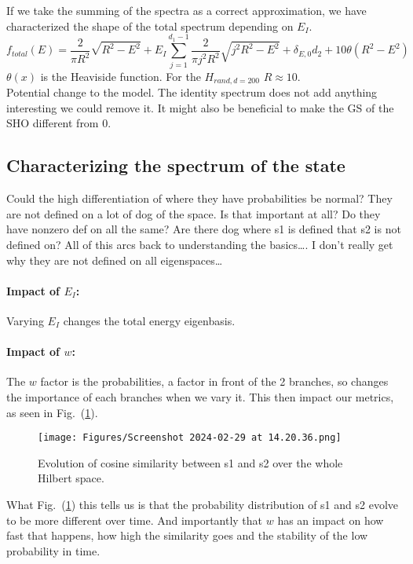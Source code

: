 \documentclass{article}
\begin{document}
If we take the summing of the spectra as a correct approximation, we have characterized the shape of the total spectrum depending on $E_I$. 
\begin{equation}
    f_{total}(E) = \frac{2}{\pi R^2}\sqrt{R^2-E^2} + E_I\sum_{j=1}^{d_1-1}\frac{2}{\pi j^2R^2}\sqrt{j^2R^2-E^2} + \delta_{E,0}d_2 + 10\theta(R^2-E^2)
\end{equation}
$\theta(x)$ is the Heaviside function. For the $H_{rand, d=200}$ $R\approx 10$.\\

Potential change to the model. The identity spectrum does not add anything interesting we could remove it. It might also be beneficial to make the GS of the SHO different from 0. 

\subsection{Characterizing the spectrum of the state}

Could the high differentiation of where they have probabilities be normal? They are not defined on a lot of dog of the space. Is that important at all? Do they have nonzero def on all the same? Are there dog where s1 is defined that s2 is not defined on?  All of this arcs back to understanding the basics….  I don’t really get why they are not defined on all eigenspaces…

\paragraph{Impact of $E_I$: }Varying $E_I$ changes the total energy eigenbasis. 

\paragraph{Impact of $w$: }The $w$ factor is the probabilities, a factor in front of the 2 branches, so changes the importance of each branches when we vary it. This then impact our metrics, as seen in  Fig.~(\ref{fig:simi}).
\begin{figure}[h]
    \centering
    \texttt{[image: Figures/Screenshot 2024-02-29 at 14.20.36.png]}
    \caption{Evolution of cosine similarity between s1 and s2 over the whole Hilbert space.}
    \label{fig:simi}
\end{figure}
What Fig.~(\ref{fig:simi}) this tells us is that the probability distribution of s1 and s2 evolve to be more different over time. And importantly that $w$ has an impact on how fast that happens, how high the similarity goes and the stability of the low probability in time.
\end{document}
